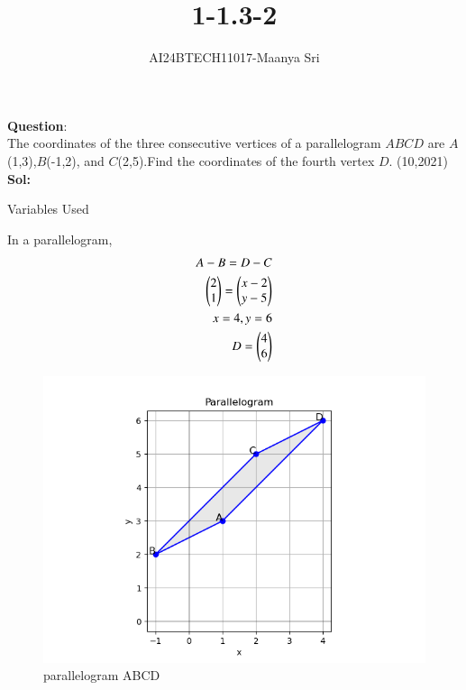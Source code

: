 \documentclass[journal]{IEEEtran}
\begin{document}

\vspace{3cm}

\title{1-1.3-2}
\author{AI24BTECH11017-Maanya Sri
}
{\let\newpage\relax\maketitle}

\renewcommand{\thefigure}{\theenumi}
\renewcommand{\thetable}{\theenumi}
\setlength{\intextsep}{10pt} %


\renewcommand{\thetable}{\theenumi}
\textbf{Question}:\\
The coordinates of the three consecutive vertices of a parallelogram $ABCD$ are $A$ (1,3),$B$(-1,2), and $C$(2,5).Find the coordinates of the fourth vertex $D$.
\hfill(10,2021)
\\ \textbf{Sol:}
\begin{table}[h!]
	\centering
	
	\caption{Variables Used}
	\label{tab1.3.2.1}
\end{table}

 In a parallelogram,
 \begin{align}
	 A-B=D-C
	 \\ \begin{pmatrix}
		 2
		 \\
		 1
	 \end{pmatrix} = \begin{pmatrix}
		 x-2
		 \\
		 y-5
	 \end{pmatrix}
	 \\ x=4 , y=6
	 \\ D = \begin{pmatrix}
		 4
		 \\
		 6
	 \end{pmatrix}
 \end{align}

\begin{figure}[h!]
	\centering
	\includegraphics[width=0.7\linewidth]{figure/Figure_1.png}
	\caption{parallelogram ABCD}
\end{figure}
\end{document}
